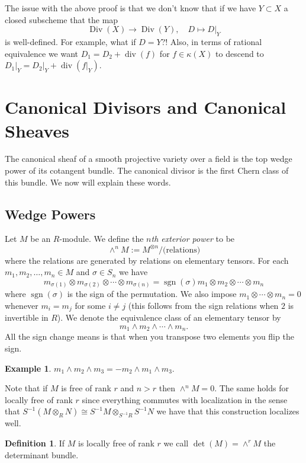 \documentclass[12pt]{article}
\numberwithin{equation}{section}
\theoremstyle{definition}
\newtheorem{definition}[theorem]{Definition}
\newtheorem{example}[theorem]{Example}
\theoremstyle{remark}
\newcommand{\Div}{\operatorname{Div}}
\renewcommand{\div}{\operatorname{div}}
\newcommand{\sgn}{\operatorname{sgn}}
\begin{document}
The issue with the above proof is that we don't know that if we have $Y\subset X$ a closed subscheme that the map 
$$ \Div(X) \to \Div(Y), \quad D \mapsto D\vert_Y $$
is well-defined. For example, what if $D=Y$?! 
Also, in terms of rational equivalence we want $D_1 = D_2 + \div(f)$ for $f\in \kappa(X)$ to descend to $D_1\vert_Y = D_2\vert_Y + \div(f\vert_Y)$.

\section{Canonical Divisors and Canonical Sheaves}

The canonical sheaf of a smooth projective variety over a field is the top wedge power of its cotangent bundle. 
The canonical divisor is the first Chern class of this bundle. 
We now will explain these words.
\subsection{Wedge Powers}
Let $M$ be an $R$-module. 
We define the \emph{$n$th exterior power} to be 
 $$ \wedge^n M := M^{\otimes n}/\mbox{(relations)}$$
where the relations are generated by relations on elementary tensors. 
For each $m_1,m_2,\ldots,m_n\in M$ and $\sigma\in S_n$ we have 
 $$m_{\sigma(1)} \otimes m_{\sigma(2)} \otimes \cdots \otimes m_{\sigma(n)} = \sgn(\sigma) m_1\otimes m_2 \otimes \cdots \otimes m_n$$
where $\sgn(\sigma)$ is the sign of the permutation. We also impose $m_1\otimes \cdots \otimes m_n=0$ whenever $m_i=m_j$ for some $i\neq j$ (this follows from the sign relations when $2$ is invertible in $R$).
We denote the equivalence class of an elementary tensor by 
 $$ m_1 \wedge m_2 \wedge \cdots \wedge m_n. $$
 All the sign change means is that when you transpose two elements you flip the sign.
 \begin{example}
 $m_1 \wedge m_2 \wedge m_3 = - m_2 \wedge m_1 \wedge m_3$. 
 \end{example}
 Note that if $M$ is free of rank $r$ and $n>r$ then $\wedge^nM=0$. 
 The same holds for locally free of rank $r$ since everything commutes with localization in the sense that $S^{-1}(M\otimes_R N) \cong S^{-1}M \otimes_{S^{-1}R} S^{-1}N$ we have that this construction localizes well. 
 
 \begin{definition}
 	If $M$ is locally free of rank $r$ we call $\det(M) = \wedge^r M$ the determinant bundle. 
 \end{definition}
\end{document}
